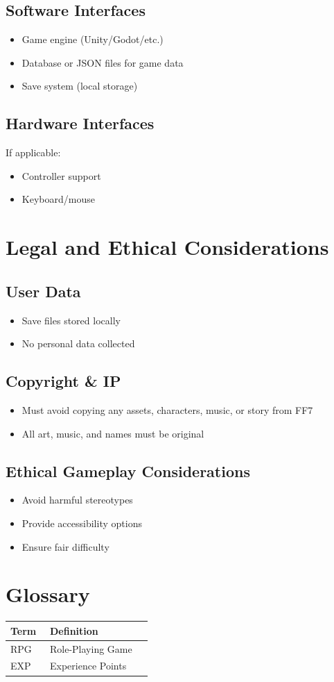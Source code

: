 \documentclass[12pt]{article}
\begin{document}
\subsection{Software Interfaces}
\begin{itemize}
    \item Game engine (Unity/Godot/etc.)
    \item Database or JSON files for game data
    \item Save system (local storage)
\end{itemize}

\subsection{Hardware Interfaces}
If applicable:
\begin{itemize}
    \item Controller support
    \item Keyboard/mouse
\end{itemize}

\section{Legal and Ethical Considerations}

\subsection{User Data}
\begin{itemize}
    \item Save files stored locally
    \item No personal data collected
\end{itemize}

\subsection{Copyright \& IP}
\begin{itemize}
    \item Must avoid copying any assets, characters, music, or story from FF7
    \item All art, music, and names must be original
\end{itemize}

\subsection{Ethical Gameplay Considerations}
\begin{itemize}
    \item Avoid harmful stereotypes
    \item Provide accessibility options
    \item Ensure fair difficulty
\end{itemize}

\section{Glossary}
\begin{longtable}{p{0.25\linewidth} p{0.65\linewidth}}
\textbf{Term} & \textbf{Definition} \\
\hline
RPG & Role-Playing Game \\
EXP & Experience Points \\
\end{longtable}
\end{document}
